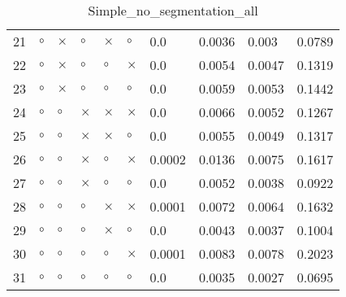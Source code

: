 \begin{table}[H]
\begin{tabular}{|P{0.7cm}|P{1.3cm}P{1.3cm}P{1.3cm}P{1.3cm}P{1.3cm}|P{1.1cm}P{1.1cm}P{1.1cm}P{1.1cm}|}
  21 &  $\circ$ & $\times$ &  $\circ$ &     $\times$ &     $\circ$ &          0.0 &          0.0036 &           0.003 &          0.0789 \\
  22 &  $\circ$ & $\times$ &  $\circ$ &      $\circ$ &    $\times$ &          0.0 &          0.0054 &          0.0047 &          0.1319 \\
  23 &  $\circ$ & $\times$ &  $\circ$ &      $\circ$ &     $\circ$ &          0.0 &          0.0059 &          0.0053 &          0.1442 \\
  24 &  $\circ$ &  $\circ$ & $\times$ &     $\times$ &    $\times$ &          0.0 &          0.0066 &          0.0052 &          0.1267 \\
  25 &  $\circ$ &  $\circ$ & $\times$ &     $\times$ &     $\circ$ &          0.0 &          0.0055 &          0.0049 &          0.1317 \\
  26 &  $\circ$ &  $\circ$ & $\times$ &      $\circ$ &    $\times$ &       0.0002 &          0.0136 &          0.0075 &          0.1617 \\
  27 &  $\circ$ &  $\circ$ & $\times$ &      $\circ$ &     $\circ$ &          0.0 &          0.0052 &          0.0038 &          0.0922 \\
  28 &  $\circ$ &  $\circ$ &  $\circ$ &     $\times$ &    $\times$ &       0.0001 &          0.0072 &          0.0064 &          0.1632 \\
  29 &  $\circ$ &  $\circ$ &  $\circ$ &     $\times$ &     $\circ$ &          0.0 &          0.0043 &          0.0037 &          0.1004 \\
  30 &  $\circ$ &  $\circ$ &  $\circ$ &      $\circ$ &    $\times$ &       0.0001 &          0.0083 &          0.0078 &          0.2023 \\
  31 &  $\circ$ &  $\circ$ &  $\circ$ &      $\circ$ &     $\circ$ &          0.0 &          0.0035 &          0.0027 &          0.0695 \\
\hline
\end{tabular}
\caption{Simple_no_segmentation_all}
\label{tab:}
\end{table}
